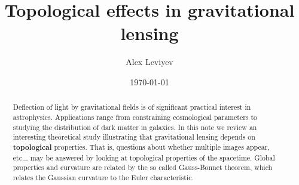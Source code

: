 \documentclass{article}
\theoremstyle{definition}
\theoremstyle{plain}
\theoremstyle{remark}
\begin{document}
\title{Topological effects in gravitational lensing}
\author[1]{Alex Leviyev}
\date{\today}
\maketitle

\begin{abstract}
Deflection of light by gravitational fields is of significant practical interest in astrophysics. Applications range from constraining cosmological parameters to studying the distribution of dark matter in galaxies. In this note we review an interesting theoretical study illustrating that gravitational lensing depends on \textbf{topological} properties. That is, questions about whether multiple images appear, etc... may be answered by looking at topological properties of the spacetime. Global properties and curvature are related by the so called Gauss-Bonnet theorem, which relates the Gaussian curvature to the Euler characteristic.
\end{abstract}

% 
% 
% 



\end{document}
